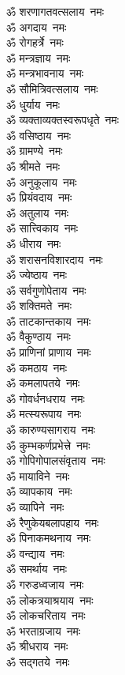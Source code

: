 \begin{multicols}{2}
\begin{flushleft}
ॐ शरणागतवत्सलाय~नमः\\
ॐ अगदाय~नमः\\
ॐ रोगहर्त्रे~नमः\\
ॐ मन्त्रज्ञाय~नमः\\
ॐ मन्त्रभावनाय~नमः\\
ॐ सौमित्रिवत्सलाय~नमः\\
ॐ धुर्याय~नमः\\
ॐ व्यक्ताव्यक्तस्वरूपधृते~नमः\\
ॐ वसिष्ठाय~नमः\hfill{}\\
ॐ ग्रामण्ये~नमः\\
ॐ श्रीमते~नमः\\
ॐ अनुकूलाय~नमः\\
ॐ प्रियंवदाय~नमः\\
ॐ अतुलाय~नमः\\
ॐ सात्त्विकाय~नमः\\
ॐ धीराय~नमः\\
ॐ शरासनविशारदाय~नमः\\
ॐ ज्येष्ठाय~नमः\\
ॐ सर्वगुणोपेताय~नमः\hfill{}\\
ॐ शक्तिमते~नमः\\
ॐ ताटकान्तकाय~नमः\\
ॐ वैकुण्ठाय~नमः\\
ॐ प्राणिनां प्राणाय~नमः\\
ॐ कमठाय~नमः\\
ॐ कमलापतये~नमः\\
ॐ गोवर्धनधराय~नमः\\
ॐ मत्स्यरूपाय~नमः\\
ॐ कारुण्यसागराय~नमः\\
ॐ कुम्भकर्णप्रभेत्त्रे~नमः\hfill{}\\
ॐ गोपिगोपालसंवृताय~नमः\\
ॐ मायाविने~नमः\\
ॐ व्यापकाय~नमः\\
ॐ व्यापिने~नमः\\
ॐ रैणुकेयबलापहाय~नमः\\
ॐ पिनाकमथनाय~नमः\\
ॐ वन्द्याय~नमः\\
ॐ समर्थाय~नमः\\
ॐ गरुडध्वजाय~नमः\\
ॐ लोकत्रयाश्रयाय~नमः\hfill{}\\
ॐ लोकचरिताय~नमः\\
ॐ भरताग्रजाय~नमः\\
ॐ श्रीधराय~नमः\\
ॐ सद्गतये~नमः\\

\end{flushleft}
\end{multicols}
